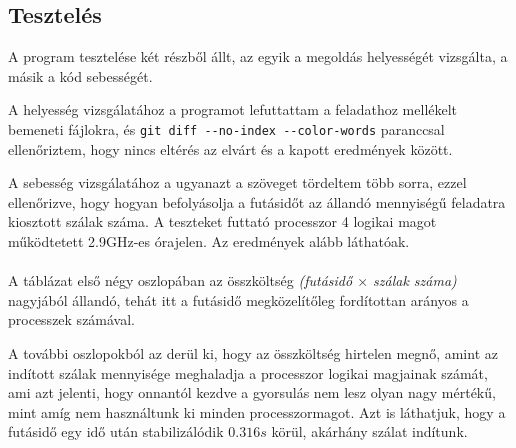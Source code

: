 \documentclass[12pt]{article}
\begin{document}
\subsection{Tesztelés}

A program tesztelése két részből állt, az egyik a megoldás helyességét vizsgálta, a másik
a kód sebességét.

A helyesség vizsgálatához a programot lefuttattam a feladathoz mellékelt bemeneti fájlokra,
és \verb|git diff --no-index --color-words| paranccsal ellenőriztem, hogy nincs eltérés az
elvárt és a kapott eredmények között.

A sebesség vizsgálatához a ugyanazt a szöveget tördeltem több sorra, ezzel
ellenőrizve, hogy hogyan befolyásolja a futásidőt az állandó mennyiségű feladatra
kiosztott szálak száma. A teszteket futtató processzor 4 logikai magot működtetett
2.9GHz-es órajelen. Az eredmények alább láthatóak.\\[12px]
\\[12px]

A táblázat első négy oszlopában az összköltség \textit{(futásidő $\times$ szálak száma)}
nagyjából állandó, tehát itt a futásidő megközelítőleg fordítottan arányos 
a processzek számával.

A további oszlopokból az derül ki, hogy az összköltség hirtelen megnő, amint az
indított szálak mennyisége meghaladja a processzor logikai magjainak számát,
ami azt jelenti, hogy onnantól kezdve a gyorsulás nem lesz olyan nagy mértékű,
mint amíg nem használtunk ki minden processzormagot. Azt is láthatjuk, hogy a
futásidő egy idő után stabilizálódik $0.316s$ körül, akárhány szálat indítunk.
\end{document}
